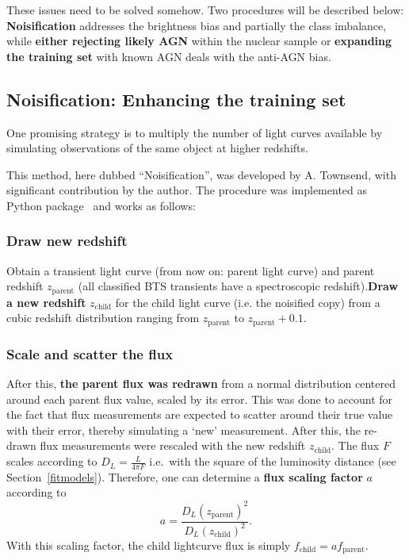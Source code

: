 These issues need to be solved somehow. Two procedures will be described below: \textbf{Noisification} addresses the brightness bias and partially the class imbalance, while \textbf{either rejecting likely AGN} within the nuclear sample or \textbf{expanding the training set} with known AGN deals with the anti-AGN bias.

\subsection{Noisification: Enhancing the training set}\label{noisification}
One promising strategy is to multiply the number of light curves available by simulating observations of the same object at higher redshifts.

This method, here dubbed ``Noisification'', was developed by A. Townsend, with significant contribution by the author. The procedure was implemented as Python package~ and works as follows:

\subsubsection{Draw new redshift}
Obtain a transient light curve (from now on: parent light curve) and parent redshift $z_\text{parent}$ (all classified BTS transients have a spectroscopic redshift).\textbf{Draw a new redshift} $z_\text{child}$ for the child light curve (i.e. the noisified copy) from a cubic redshift distribution ranging from $z­_\text{parent}$ to $z_\text{parent}+0.1$.

\subsubsection{Scale and scatter the flux}
After this, \textbf{the parent flux was redrawn} from a normal distribution centered around each parent flux value, scaled by its error. This was done to account for the fact that flux measurements are expected to scatter around their true value with their error, thereby simulating a `new' measurement. After this, the re-drawn flux measurements were rescaled with the new redshift $z_\text{child}$. The flux $F$ scales according to $D_L=\frac{L}{4 \pi F}$ i.e.~with the square of the luminosity distance (see Section~\ref{fitmodels}). Therefore, one can determine a \textbf{flux scaling factor} $a$ according to
\begin{equation}
    a = \frac{D_L(z_\text{parent})^2}{D_L(z_\text{child})^2}.
\end{equation}
With this scaling factor, the child lightcurve flux is simply $f_\text{child} = a f_\text{parent}$.

